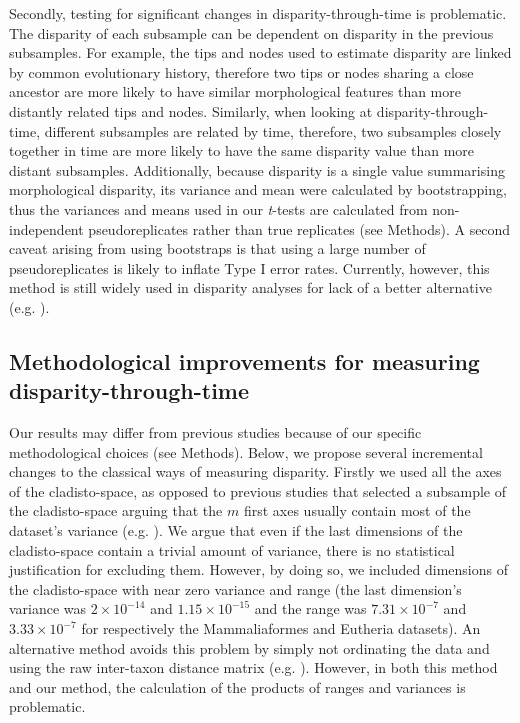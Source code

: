 \documentclass[10pt,letterpaper]{article}
\begin{document}
Secondly, testing for significant changes in disparity-through-time is problematic.
The disparity of each subsample can be dependent on disparity in the previous subsamples.
For example, the tips and nodes used to estimate disparity are linked by common evolutionary history, therefore two tips or nodes sharing a close ancestor are more likely to have similar morphological features than more distantly related tips and nodes.
Similarly, when looking at disparity-through-time, different subsamples are related by time, therefore, two subsamples closely together in time are more likely to have the same disparity value than more distant subsamples.
Additionally, because disparity is a single value summarising morphological disparity, its variance and mean were calculated by bootstrapping, thus the variances and means used in our \textit{t}-tests are calculated from non-independent pseudoreplicates rather than true replicates (see Methods).
A second caveat arising from using bootstraps is that using a large number of pseudoreplicates is likely to inflate Type I error rates. 
Currently, however, this method is still widely used in disparity analyses for lack of a better alternative (e.g. \cite{anderson2012using,zelditch2012geometric,smith2014joined}).

\subsection*{Methodological improvements for measuring disparity-through-time}
Our results may differ from previous studies because of our specific methodological choices (see Methods).
Below, we propose several incremental changes to the classical ways of measuring disparity.
Firstly we used all the axes of the cladisto-space, as opposed to previous studies that selected a subsample of the cladisto-space arguing that the $m$ first axes usually contain most of the dataset's variance (e.g. \cite{brusatte50,cisneros2010,prentice2011,anderson2012using,Hughes20082013,bentonmodels2014}).
We argue that even if the last dimensions of the cladisto-space contain a trivial amount of variance, there is no statistical justification for excluding them.
However, by doing so, we included dimensions of the cladisto-space with near zero variance and range (the last dimension's variance was $2\times10^{-14}$ and $1.15\times10^{-15}$ and the range was $7.31\times10^{-7}$ and $3.33\times10^{-7}$ for respectively the Mammaliaformes and Eutheria datasets).
An alternative method avoids this problem by simply not ordinating the data and using the raw inter-taxon distance matrix (e.g. \cite{bensonfaunal2014,Close2015}).
However, in both this method and our method, the calculation of the products of ranges and variances is problematic.
\end{document}
